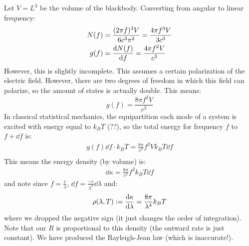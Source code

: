 Let $V = L^3$ be the volume of the blackbody. Converting from angular to linear frequency:
\begin{align*}
    N(f) &= \frac{(2 \pi f)^3 V}{6 c^3 \pi^2} = \frac{4 \pi f^3 V}{3 c^3} \\
    g(f) &= \derivative{N(f)}{f} = \frac{4 \pi f^2 V}{c^3}
\end{align*}
However, this is slightly incomplete. This assumes a certain polarization of the electric field. However, there are two degrees of freedom in which
this field can polarize, so the amount of states is actually double. This means:
\[ g(f) = \frac{8 \pi f^2 V}{c^3} \]
In classical statistical mechanics, the equipartition each mode of a system is excited with energy equal to $k_B T$ (??), so the total energy for frequency $f$ to $f + \dd{f}$ is:
\begin{align*}
    g(f) \dd{f} \cdot k_B T = \frac{8 \pi}{c^3} f^2 V k_B T \dd{f} \\
\end{align*}
This means the energy density (by volume) is:
\begin{align*}
    \dd{\kappa} = \frac{8\pi}{c^3} f^2 k_B T \dd{f}
\end{align*}
and note since $f = \frac{c}{\lambda}$, $\dd{f} = \frac{-c}{\lambda^2} \dd{\lambda}$ and:
\begin{align*}
    \rho(\lambda, T) := \derivative{\kappa}{\lambda} = \frac{8\pi}{\lambda^4} k_B T
\end{align*}
where we dropped the negative sign (it just changes the order of integration). Note that our $R$ is proportional to this density (the outward rate is just constant).
We have produced the Rayleigh-Jean law (which is inaccurate!).

